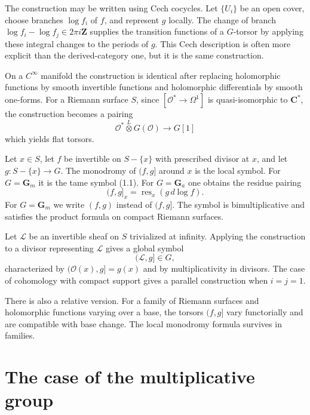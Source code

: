 \documentclass[11pt]{article}
\theoremstyle{remark}
\newcommand{\C}{\mathbf C}
\newcommand{\Z}{\mathbf Z}
\newcommand{\Gm}{\mathbf G_m}
\newcommand{\OO}{\mathcal O}
\newcommand{\LL}{\mathcal L}
\begin{document}
The construction may be written using Cech cocycles. Let $\{U_i\}$ be an open cover, choose branches $\log f_i$ of $f$, and represent $g$ locally. The change of branch $\log f_i-\log f_j\in2\pi i\Z$ supplies the transition functions of a $G$-torsor by applying these integral changes to the periods of $g$. This Cech description is often more explicit than the derived-category one, but it is the same construction.

On a $C^\infty$ manifold the construction is identical after replacing holomorphic functions by smooth invertible functions and holomorphic differentials by smooth one-forms. For a Riemann surface $S$, since $[\OO^*\to\Omega^1]$ is quasi-isomorphic to $\C^*$, the construction becomes a pairing
\begin{equation}\tag{2.6.1}
 \OO^*\overset L\otimes G(\OO)\longrightarrow G[1]
\end{equation}
which yields flat torsors.

Let $x\in S$, let $f$ be invertible on $S-\{x\}$ with prescribed divisor at $x$, and let $g:S-\{x\}\to G$. The monodromy of $(f,g]$ around $x$ is the local symbol. For $G=\Gm$ it is the tame symbol (1.1). For $G=\mathbf G_a$ one obtains the residue pairing
\begin{equation}\tag{2.8.1}
 (f,g]_x=\operatorname{res}_x(g\,d\log f).
\end{equation}
For $G=\Gm$ we write $(f,g)$ instead of $(f,g]$. The symbol is bimultiplicative and satisfies the product formula on compact Riemann surfaces.

Let $\LL$ be an invertible sheaf on $S$ trivialized at infinity. Applying the construction to a divisor representing $\LL$ gives a global symbol
\begin{equation}\tag{2.10.1}
 (\LL,g]\in G,
\end{equation}
characterized by $(\OO(x),g]=g(x)$ and by multiplicativity in divisors. The case of cohomology with compact support gives a parallel construction when $i=j=1$.

There is also a relative version. For a family of Riemann surfaces and holomorphic functions varying over a base, the torsors $(f,g]$ vary functorially and are compatible with base change. The local monodromy formula survives in families.

\section{The case of the multiplicative group}
\end{document}
